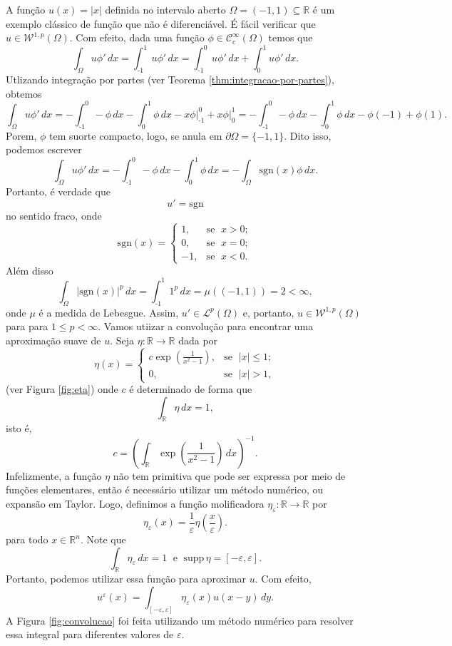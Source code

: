 \documentclass[a4paper, 11pt]{book}
\theoremstyle{definition}
\newcommand{\m}{\text{-}}
\newcommand{\bR}{\mathbb{R}}
\newcommand{\cC}{\mathcal{C}}
\newcommand{\cL}{\mathcal{L}}
\newcommand{\cW}{\mathcal{W}}
\newcommand{\supp}{\mathrm{supp}\,}
\newcommand{\sgn}{\mathrm{sgn}}
\begin{document}
\begin{ex}
    A função $u(x) = |x|$ definida no intervalo aberto $\Omega = (-1,1) \subseteq \bR$ é um exemplo clássico de função que não é diferenciável. É fácil verificar que $u \in \cW^{1,p}(\Omega)$. Com efeito, dada uma função $\phi \in \cC^\infty_c(\Omega)$ temos que
    \[
        \int_\Omega u \phi' \,dx = \int_{\text{-}1}^1 u \phi' \,dx = \int_{\text{-}1}^0 u \phi' \,dx + \int_0^1 u \phi' \,dx.
    \]
    Utlizando integração por partes (ver Teorema \ref{thm:integracao-por-partes}), obtemos
    \[
        \int_\Omega u \phi'\,dx =  - \int_{\m1}^0 -\phi \,dx  - \int_0^1 \phi \,dx -x \phi \bigg|^{0}_{\m1}+ x\phi \bigg|_0^1 = -\int_{\m1}^{0} - \phi \,dx -\int_0^1 \phi \,dx - \phi(-1) + \phi(1).
    \]
    Porem, $\phi$ tem suorte compacto, logo, se anula em $\partial\Omega = \{-1,1\}$. Dito isso, podemos escrever
    \[
        \int_\Omega u \phi'\,dx = - \int_{\text{-}1}^0 -\phi \,dx - \int_0^1 \phi \,dx = -\int_\Omega \sgn(x)\phi \,dx.
    \]
    Portanto, é verdade que
    \[
        u'= \sgn
    \]
    no sentido fraco, onde
    \[
        \sgn(x) = 
        \left\{ 
            \begin{array}{rr}
                1, &\!\text{se }\; x > 0;\\
                0, &\!\text{se }\; x = 0;\\
                -1,&\!\text{se }\; x < 0.
            \end{array}
        \right.
    \]
    Além disso
    \[
        \int_\Omega |\sgn(x)|^p \,dx = \int_{\text{-}1}^1 1^p \,dx =  \mu((-1,1)) = 2 < \infty,
    \]
    onde $\mu$ é a medida de Lebesgue. Assim, $u'\in \cL^p(\Omega)$ e, portanto, $u \in \cW^{1,p}(\Omega)$ para para $1 \leqslant p < \infty$.
    Vamos utiizar a convolução para encontrar uma aproximação suave de $u$. 
    Seja $\eta : \bR \to \bR$ dada por
    \[
        \eta(x) = \left\{ 
            \begin{array}{lr}
                c \exp\left(\frac{1}{x^2 - 1} \right), & \text{se }\; |x| \leqslant 1;\\
                0, & \text{se }\; |x| > 1,
            \end{array}
        \right.
    \]
    (ver Figura \ref{fig:eta})
    onde $c$ é determinado de forma que
    \[
        \int_{\bR} \eta \,dx = 1,
    \]
    isto é,
    \[
        c = \left( \int_\bR \exp \left(\frac{1}{x^2 - 1} \right) \, dx\right)^{-1}.
    \]
    Infelizmente, a função $\eta$ não tem primitiva que pode ser expressa por meio de funções elementares, então é necessário utilizar um método numérico, ou expansão em Taylor.
    Logo, definimos a função molificadora $\eta_\varepsilon : \bR \to \bR$ por
    \[
        \eta_\varepsilon(x) = \frac{1}{\varepsilon} \eta\left( \frac{x}{\varepsilon} \right).
    \]
    para todo $x \in \bR^n$. Note que
    \[
        \int_\bR \eta_\varepsilon \, dx = 1 \;\text{ e }\; \supp \eta = [-\varepsilon,\varepsilon].
    \]
    Portanto, podemos utilizar essa função para aproximar $u$. Com efeito,
    \[
        u^\varepsilon(x) = \int_{[-\varepsilon,\varepsilon]} \eta_\varepsilon(x) u(x-y) \,dy.
    \]
    A Figura \ref{fig:convolucao} foi feita utilizando um método numérico para resolver essa integral para diferentes valores de $\varepsilon$.


\end{ex}
\end{document}
